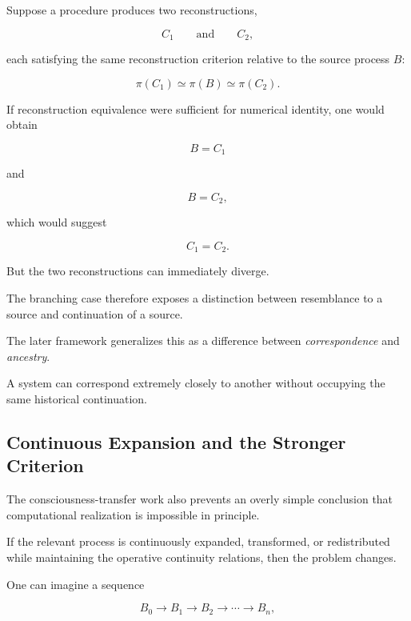 \documentclass[11pt]{article}
\theoremstyle{remark}
\begin{document}
Suppose a procedure produces two reconstructions,

\begin{equation}
C_1
\qquad\text{and}\qquad
C_2,
\end{equation}

each satisfying the same reconstruction criterion relative to the source process $B$:

\begin{equation}
\pi(C_1)
\simeq
\pi(B)
\simeq
\pi(C_2).
\end{equation}

If reconstruction equivalence were sufficient for numerical identity, one would obtain

\begin{equation}
B=C_1
\end{equation}

and

\begin{equation}
B=C_2,
\end{equation}

which would suggest

\begin{equation}
C_1=C_2.
\end{equation}

But the two reconstructions can immediately diverge.

The branching case therefore exposes a distinction between resemblance to a source and continuation of a source.

The later framework generalizes this as a difference between \emph{correspondence} and \emph{ancestry}.

A system can correspond extremely closely to another without occupying the same historical continuation.

\subsection{Continuous Expansion and the Stronger Criterion}

The consciousness-transfer work also prevents an overly simple conclusion that computational realization is impossible in principle.

If the relevant process is continuously expanded, transformed, or redistributed while maintaining the operative continuity relations, then the problem changes.

One can imagine a sequence

\begin{equation}
B_0
\rightarrow
B_1
\rightarrow
B_2
\rightarrow
\cdots
\rightarrow
B_n,
\end{equation}
\end{document}
